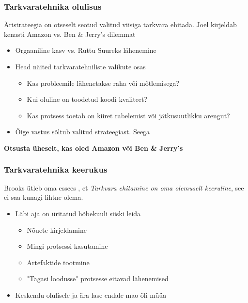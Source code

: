 \begin{frame}[fragile]
  \frametitle{Tarkvaratehnika olulisus}
  Äristrateegia on otseselt seotud valitud viisiga tarkvara ehitada. Joel \citep{spolsky2004joel2} kirjeldab kenasti Amazon vs. Ben \& Jerry's dilemmat
  \begin{itemize}
  	\item Orgaaniline kasv vs. Ruttu Suureks lähenemine
	\item Head näited tarkvaratehniliste valikute osas
		  \begin{itemize}
		  	\item Kas probleemile lähenetakse raha või mõtlemisega?
			\item Kui oluline on toodetud koodi kvaliteet?
			\item Kas protsess toetab on kiiret rabelemist või jätkusuutlikku arengut?
		  \end{itemize}
	\item Õige vastus sõltub valitud strateegiast. Seega
  \end{itemize}
  \begin{center}
	  \textbf{Otsusta üheselt, kas oled Amazon või Ben \& Jerry's}
  \end{center}
\end{frame}

\begin{frame}[fragile]
  \frametitle{Tarkvaratehnika keerukus}
	Brooks ütleb oma essees \citep{brooks1975mythical}, et \emph{Tarkvara ehitamine on oma olemuselt keeruline}, see ei saa kunagi lihtne olema. 
  \begin{itemize}
	\item Läbi aja on üritatud hõbekuuli siiski leida
		  \begin{itemize}
		  	\item Nõuete kirjeldamine
			\item Mingi protsessi kasutamine
			\item Artefaktide tootmine
			\item "Tagasi loodusse" protsesse eitavad lähenemised
		  \end{itemize}
	\item Keskendu olulisele ja ära lase endale mao-õli müüa
  \end{itemize}
\end{frame}


